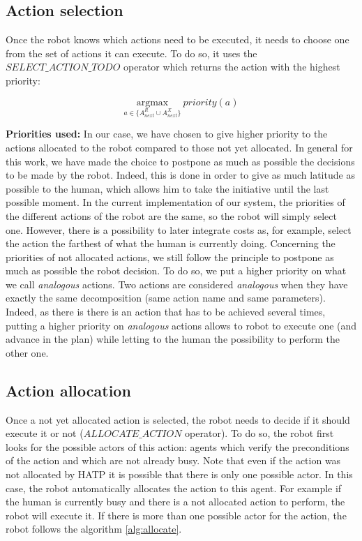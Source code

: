 \documentclass[english,a4paper,11pt,twoside]{StyleThese}
\begin{document}
\subsection{Action selection}
\label{subsec:selection}

Once the robot knows which actions need to be executed, it needs to choose one from the set of actions it can execute. To do so, it uses the $SELECT\_ACTION\_TODO$ operator which returns the action with the highest priority:

$$\underset{a \in \{A^R_{next} \cup A^X_{next}\}}{\mathrm{argmax}} \ priority(a)$$

\textbf{Priorities used:}
In our case, we have chosen to give higher priority to the actions allocated to the robot compared to those not yet allocated. In general for this work, we have made the choice to postpone as much as possible the decisions to be made by the robot. Indeed, this is done in order to give as much latitude as possible to the human, which allows him to take the initiative until the last possible moment. In the current implementation of our system, the priorities of the different actions of the robot are the same, so the robot will simply select one. However, there is a possibility to later integrate costs as, for example, select the action the farthest of what the human is currently doing. Concerning the priorities of not allocated actions, we still follow the principle to postpone as much as possible the robot decision. To do so, we put a higher priority on what we call \textit{analogous} actions. Two actions are considered \textit{analogous} when they have exactly the same decomposition (same action name and same parameters). Indeed, as there is there is an action that has to be achieved several times, putting a higher priority on \textit{analogous} actions allows to robot to execute one (and advance in the plan) while letting to the human the possibility to perform the other one.

\subsection{Action allocation}
\label{subsec:allocation}

Once a not yet allocated action is selected, the robot needs to decide if it should execute it or not ($ALLOCATE\_ACTION$ operator). To do so, the robot first looks for the possible actors of this action: agents which verify the preconditions of the action and which are not already busy. Note that even if the action was not allocated by HATP it is possible that there is only one possible actor. In this case, the robot automatically allocates the action to this agent. For example if the human is currently busy and there is a not allocated action  to perform, the robot will execute it. If there is more than one possible actor for the action, the robot follows the algorithm \ref{alg:allocate}.
\end{document}
